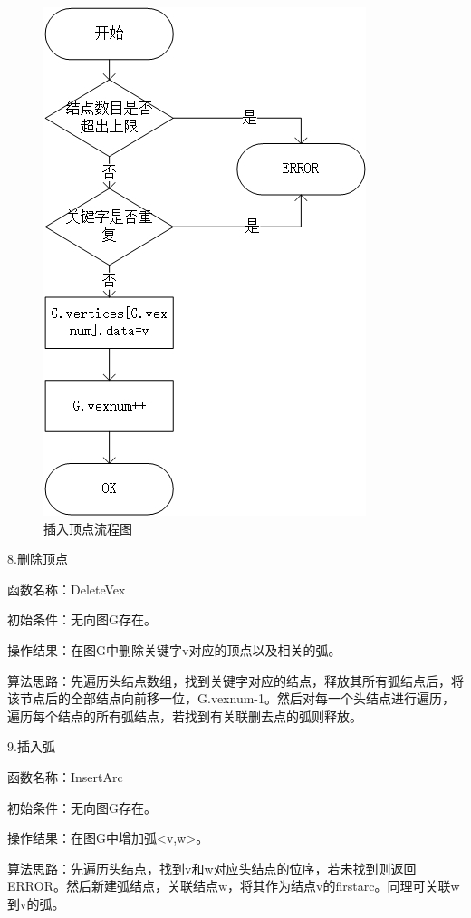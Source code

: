\documentclass[supercite]{Experimental_Report}
\theoremstyle{definition}
\begin{document}
\begin{figure}[htb] %
	\begin{center}
		\includegraphics[scale=0.9]{./images/图/InsertVex.jpg}
		\caption{插入顶点流程图}
		\label{fig2-6}
	\end{center}
\end{figure}

8.删除顶点

函数名称：DeleteVex

初始条件：无向图G存在。

操作结果：在图G中删除关键字v对应的顶点以及相关的弧。

算法思路：先遍历头结点数组，找到关键字对应的结点，释放其所有弧结点后，将该节点后的全部结点向前移一位，G.vexnum-1。然后对每一个头结点进行遍历，遍历每个结点的所有弧结点，若找到有关联删去点的弧则释放。

9.插入弧

函数名称：InsertArc

初始条件：无向图G存在。

操作结果：在图G中增加弧<v,w>。

算法思路：先遍历头结点，找到v和w对应头结点的位序，若未找到则返回ERROR。然后新建弧结点，关联结点w，将其作为结点v的firstarc。同理可关联w到v的弧。
\end{document}

